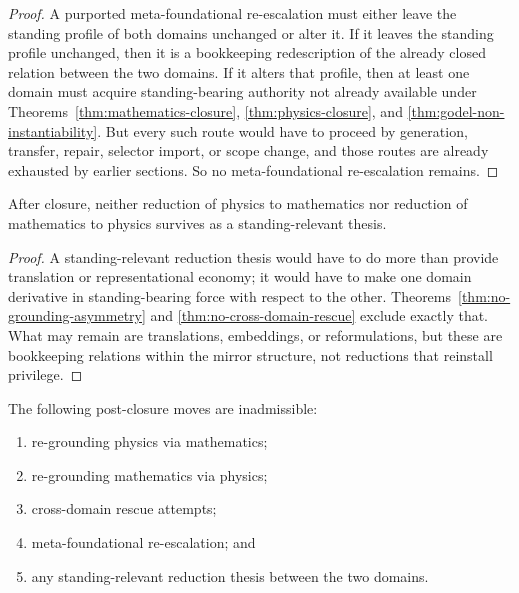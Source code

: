 \begin{proof}
A purported meta-foundational re-escalation must either leave the standing profile of both domains unchanged or alter it. If it leaves the standing profile unchanged, then it is a bookkeeping redescription of the already closed relation between the two domains. If it alters that profile, then at least one domain must acquire standing-bearing authority not already available under Theorems~\ref{thm:mathematics-closure}, \ref{thm:physics-closure}, and \ref{thm:godel-non-instantiability}. But every such route would have to proceed by generation, transfer, repair, selector import, or scope change, and those routes are already exhausted by earlier sections. So no meta-foundational re-escalation remains.
\end{proof}

\begin{corollary}
\label{cor:no-reduction-thesis}
After closure, neither reduction of physics to mathematics nor reduction of mathematics to physics survives as a standing-relevant thesis.
\end{corollary}

\begin{proof}
A standing-relevant reduction thesis would have to do more than provide translation or representational economy; it would have to make one domain derivative in standing-bearing force with respect to the other. Theorems~\ref{thm:no-grounding-asymmetry} and \ref{thm:no-cross-domain-rescue} exclude exactly that. What may remain are translations, embeddings, or reformulations, but these are bookkeeping relations within the mirror structure, not reductions that reinstall privilege.
\end{proof}

\begin{corollary}
\label{cor:prohibition-package}
The following post-closure moves are inadmissible:
\begin{enumerate}
  \item re-grounding physics via mathematics;
  \item re-grounding mathematics via physics;
  \item cross-domain rescue attempts;
  \item meta-foundational re-escalation; and
  \item any standing-relevant reduction thesis between the two domains.
\end{enumerate}
\end{corollary}

